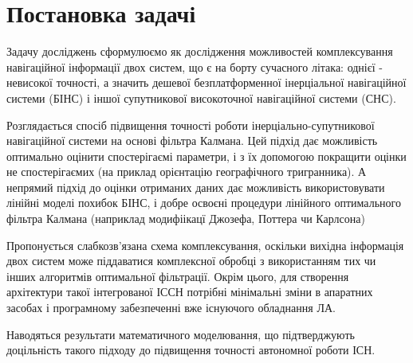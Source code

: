 \section{Постановка задачі}

Задачу досліджень сформулюємо як дослідження можливостей комплексування 
навігаційної інформації двох систем, що є на борту сучасного літака: 
однієї - невисокої точності, а значить дешевої безплатформенної інерціальної 
навігаційної системи (БІНС) і іншої супутникової високоточної навігаційної системи (СНС).

Розглядається спосіб підвищення точності роботи інерціально-супутникової 
навігаційної системи на основі фільтра Калмана. Цей підхід дає можливість 
оптимально оцінити спостерігаємі параметри, і з їх допомогою покращити оцінки 
не спостерігаємих (на приклад орієнтацію географічного тригранника). А непрямий 
підхід до оцінки отриманих даних дає можливість використовувати лінійні моделі 
похибок БІНС, і добре освоєні процедури лінійного оптимального фільтра Калмана 
(наприклад модифіікацї Джозефа, Поттера чи Карлсона)

Пропонується слабкозв’язана схема комплексування, оскільки вихідна інформація 
двох систем може піддаватися комплексної обробці з використанням тих чи інших 
алгоритмів оптимальної фільтрації.  Окрім цього, для створення  архітектури 
такої інтегрованої ІССН потрібні мінімальні зміни в апаратних засобах і 
програмному забезпеченні вже існуючого обладнання ЛА.

Наводяться результати математичного моделювання, що підтверджують 
доцільність такого підходу до підвищення точності автономної роботи ІСН.



